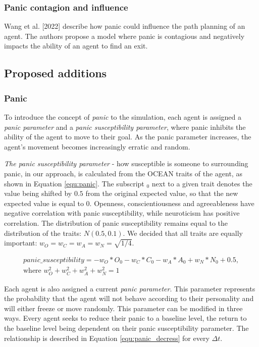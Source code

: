 \documentclass[9pt]{pnas-new}
\begin{document}
\subsubsection{Panic contagion and influence}
Wang et al. [2022] describe how panic could influence the path planning of an agent.
The authors propose a model where panic is contagious and negatively impacts the ability of an agent to find an exit.

\subsection{Proposed additions}

\subsubsection{Panic}
To introduce the concept of \emph{panic} to the simulation, each agent is assigned a \emph{panic parameter} and a \emph{panic susceptibility parameter}, where panic inhibits the ability of the agent to move to their goal. As the panic parameter increases, the agent's movement becomes increasingly erratic and random.

\emph{The panic susceptibility parameter} - how susceptible is someone to surrounding panic, in our approach, is calculated from the OCEAN traits of the agent, as shown in Equation \ref{equ:panic}. The subscript $_0$ next to a given trait denotes the value being shifted by $0.5$ from the original expected value, so that the new expected value is equal to $0$. Openness, conscientiousness and agreeableness have negative correlation with panic susceptibility, while neuroticism has positive correlation. The distribution of panic susceptibility remains equal to the distribution of the traits: $N(0.5,0.1)$. We decided that all traits are equally important: \(w_O = w_C= w_A= w_N= \sqrt{1/4}\).

\begin{align}
    \label{equ:panic}
    panic\_susceptibility = -w_O * O_0 - w_C* C_0 - w_A* A_0 + w_N *  
    N_0 + 0.5, \\
    \text{where } w_O^2 + w_C^2 + w_A^2 + w_N^2 = 1 \nonumber
\end{align}

Each agent is also assigned a current \emph{panic parameter}. This parameter represents the probability that the agent will not behave according to their personality and will either freeze or move randomly. This parameter can be modified in three ways. Every agent seeks to reduce their panic to a baseline level, the return to the baseline level being dependent on their panic susceptibility parameter. The relationship is described in Equation \ref{equ:panic_decress} for every $\Delta{t}$.
\end{document}
